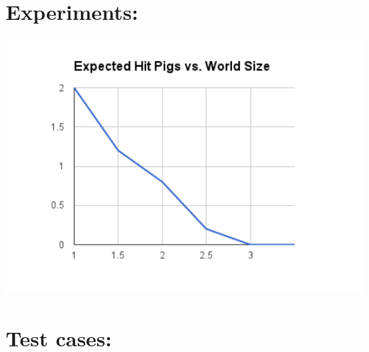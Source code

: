 \documentclass[]{article}
\makeatletter
\def\maxwidth{\ifdim\Gin@nat@width>\linewidth\linewidth
\else\Gin@nat@width\fi}
\let\Oldincludegraphics\includegraphics
\renewcommand{\includegraphics}[1]{\Oldincludegraphics[width=\maxwidth]{#1}}
\makeatother
\begin{document}
\section{Experiments:}
\includegraphics{figs/chart_1.pdf}

\pagebreak

\section{Test cases:}
\end{document}
